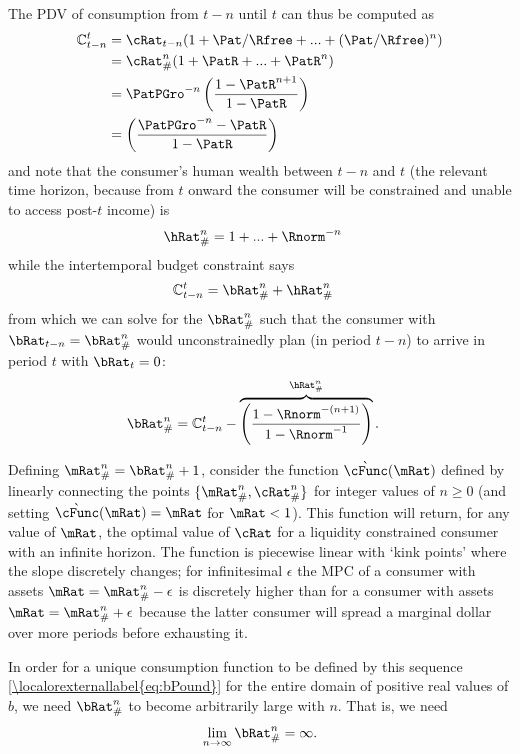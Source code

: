 \documentclass[\econtexRoot/BufferStockTheory.tex]{subfiles}
\begin{document}
The PDV of consumption from $t-n$ until $t$ can thus be computed as
\begin{align}
   \mathbb{C}_{t-n}^{t}  & = \cRat_{t-n}(1+\Pat/\Rfree+ ... + (\Pat/\Rfree)^{n}) \notag
\\  & = \cRat_{\#}^{n}(1+\PatR+ ... + \PatR^{n}) \notag
\\  & = \PatPGro^{-n}\left(\frac{1-\PatR^{n+1}}{1-\PatR}\right) \label{PDVc}
\\  & = \left(\frac{\PatPGro^{-n}-\PatR}{1-\PatR}\right) 
\end{align}
and note that the consumer's human wealth between $t-n$ and $t$ (the relevant
time horizon, because from $t$ onward the consumer will be constrained
and unable to access post-$t$ income) is
\begin{align}
  \hRat_{\#}^{n}  & = 1+...+\Rnorm^{-n}
\end{align}
while the intertemporal budget constraint says
\begin{eqnarray*}
  \mathbb{C}_{t-n}^{t}  & = \bRat_{\#}^{n}+\hRat_{\#}^{n}
\end{eqnarray*}
from which we can solve for the $\bRat_{\#}^{n}$ such that
the consumer with $\bRat_{t-n} = \bRat_{\#}^{n}$ would
unconstrainedly plan (in period $t-n$) to arrive in period $t$ with
$\bRat_{t}=0$:
\begin{align}
\bRat_{\#}^{n} & =  \mathbb{C}_{t-n}^{t} - \overbrace{\left(\frac{1-\Rnorm^{-(n+1)}}{1-\Rnorm^{-1}}\right)}^{\hRat_{\#}^{n}} \label{eq:bPound}.
\end{align}

Defining $\mRat_{\#}^{n}=\bRat_{\#}^{n}+1$, consider the function
$\grave{\cFunc}(\mRat)$ defined by linearly connecting the points
$\{\mRat_{\#}^{n},\cRat_{\#}^{n}\}$ for integer values of $n \geq 0$
(and setting $\grave{\cFunc}(\mRat)=\mRat$ for $\mRat<1$).  This
function will return, for any value of $\mRat$, the optimal value of
$\cRat$ for a liquidity constrained consumer with an infinite horizon.
The function is piecewise linear with `kink points' where the slope
discretely changes; for infinitesimal $\epsilon$ the MPC of a
consumer with assets $\mRat=\mRat_{\#}^{n}-\epsilon$ is discretely
higher than for a consumer with assets $\mRat=\mRat_{\#}^{n}+\epsilon$
because the latter consumer will spread a marginal dollar over more
periods before exhausting it.

In order for a unique consumption function to be defined by this
sequence \eqref{\localorexternallabel{eq:bPound}} for the entire domain of positive real
values of $b$, we need $\bRat_{\#}^{n}$ to become arbitrarily large with
$n$.  That is, we need
\begin{align}
  \lim_{n \rightarrow \infty} \bRat_{\#}^{n} = \infty. \label{eq:bToInfty}
\end{align}
\end{document}

